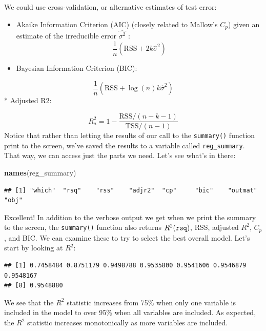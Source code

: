 \documentclass[
]{article}
\newenvironment{Shaded}{\begin{snugshade}}{\end{snugshade}}
\newcommand{\KeywordTok}[1]{\textcolor[rgb]{0.13,0.29,0.53}{\textbf{#1}}}
\newcommand{\NormalTok}[1]{#1}
\newcommand{\OperatorTok}[1]{\textcolor[rgb]{0.81,0.36,0.00}{\textbf{#1}}}
\providecommand{\tightlist}{%
  \setlength{\itemsep}{0pt}\setlength{\parskip}{0pt}}
\begin{document}
We could use cross-validation, or alternative estimates of test error:

\begin{itemize}
\tightlist
\item
  Akaike Information Criterion (AIC) (closely related to Mallow's
  \(C_p\)) given an estimate of the irreducible error \(\hat{\sigma^2}\)
  : \[\frac{1}{n}(\text{RSS}+2k\hat\sigma^2)\]
\item
  Bayesian Information Criterion (BIC):
\end{itemize}

\[\frac{1}{n}(\text{RSS}+\log(n)k\hat\sigma^2)\] * Adjusted R2:

\[R^2_a = 1-\frac{\text{RSS}/(n-k-1)}{\text{TSS}/(n-1)}\] Notice that
rather than letting the results of our call to the \texttt{summary()}
function print to the screen, we've saved the results to a variable
called \texttt{reg\_summary}. That way, we can access just the parts we
need. Let's see what's in there:

\begin{Shaded}
\begin{Highlighting}[]
\KeywordTok{names}\NormalTok{(reg_summary)}
\end{Highlighting}
\end{Shaded}

\begin{verbatim}
## [1] "which"  "rsq"    "rss"    "adjr2"  "cp"     "bic"    "outmat" "obj"
\end{verbatim}

Excellent! In addition to the verbose output we get when we print the
summary to the screen, the \texttt{summary()} function also returns
\(R^2 (\tt{rsq})\), RSS, adjusted \(R^2\), \(C_p\), and BIC. We can
examine these to try to select the best overall model. Let's start by
looking at \(R^2\):

\begin{Shaded}
\end{Shaded}

\begin{verbatim}
## [1] 0.7458484 0.8751179 0.9498788 0.9535800 0.9541606 0.9546879 0.9548167
## [8] 0.9548880
\end{verbatim}

We see that the \(R^2\) statistic increases from 75\% when only one
variable is included in the model to over 95\% when all variables are
included. As expected, the \(R^2\) statistic increases monotonically as
more variables are included.
\end{document}
